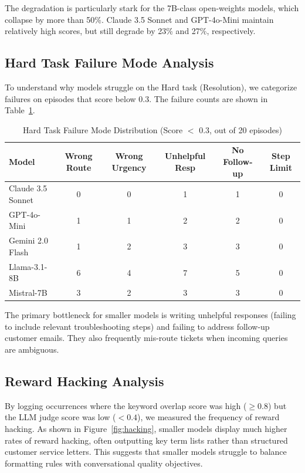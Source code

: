 \documentclass{article}
\begin{document}
The degradation is particularly stark for the 7B-class open-weights models, which collapse by more than 50\%. Claude 3.5 Sonnet and GPT-4o-Mini maintain relatively high scores, but still degrade by 23\% and 27\%, respectively.

\subsection{Hard Task Failure Mode Analysis}

To understand why models struggle on the Hard task (Resolution), we categorize failures on episodes that score below 0.3. The failure counts are shown in Table~\ref{tab:failures}.

\begin{table}[ht]
\centering
\caption{Hard Task Failure Mode Distribution (Score $<$ 0.3, out of 20 episodes)}
\label{tab:failures}
\begin{tabular}{lccccc}
\toprule
\textbf{Model} & \textbf{Wrong Route} & \textbf{Wrong Urgency} & \textbf{Unhelpful Resp} & \textbf{No Follow-up} & \textbf{Step Limit} \\
\midrule
Claude 3.5 Sonnet & 0 & 0 & 1 & 1 & 0 \\
GPT-4o-Mini       & 1 & 1 & 2 & 2 & 0 \\
Gemini 2.0 Flash  & 1 & 2 & 3 & 3 & 0 \\
Llama-3.1-8B      & 6 & 4 & 7 & 5 & 0 \\
Mistral-7B        & 3 & 2 & 3 & 3 & 0 \\
\bottomrule
\end{tabular}
\end{table}

The primary bottleneck for smaller models is writing unhelpful responses (failing to include relevant troubleshooting steps) and failing to address follow-up customer emails. They also frequently mis-route tickets when incoming queries are ambiguous.

\subsection{Reward Hacking Analysis}

By logging occurrences where the keyword overlap score was high ($\ge 0.8$) but the LLM judge score was low ($< 0.4$), we measured the frequency of reward hacking. As shown in Figure~\ref{fig:hacking}, smaller models display much higher rates of reward hacking, often outputting key term lists rather than structured customer service letters. This suggests that smaller models struggle to balance formatting rules with conversational quality objectives.
\end{document}

